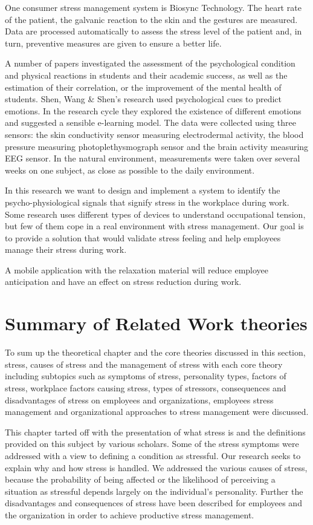 One consumer stress management system is Biosync Technology. The heart rate of the patient, the galvanic reaction to the skin and the gestures are measured. Data are processed automatically to assess the stress level of the patient and, in turn, preventive measures are given to ensure a better life\citep{Nishida2017BioSync:Experience}.

A number of papers investigated the assessment of the psychological condition and physical reactions in students\citep{Santos-Gago2019InnovativeReview} and their academic success, as well as the estimation of their correlation, or the improvement of the mental health of students. Shen, Wang \& Shen's research \citep{article} used psychological cues to predict emotions.  In the research cycle they explored the existence of different emotions and suggested a sensible e-learning model. The data were collected using three sensors: the skin conductivity sensor measuring electrodermal activity, the blood pressure measuring photoplethysmograph sensor and the brain activity measuring EEG sensor. In the natural environment, measurements were taken over several weeks on one subject, as close as possible to the daily environment.

In this research we want to design and implement a system to identify the psycho-physiological signals that signify stress in the workplace during work. Some research uses different types of devices to understand occupational tension, but few of them cope in a real environment with stress management. Our goal is to provide a solution that would validate stress feeling and help employees manage their stress during work.

A mobile application with the relaxation material will reduce employee anticipation and have an effect on stress reduction during work.
\section{Summary of Related Work theories}
To sum up the theoretical chapter and the core theories discussed in this section, stress, causes of stress and the management of stress with each core theory including subtopics such as symptoms of stress, personality types, factors of stress, workplace factors causing stress, types of stressors, consequences and disadvantages of stress on employees and organizations, employees stress management and organizational approaches to stress management were discussed.

This chapter tarted off with the presentation of what stress is and the definitions provided on this subject by various scholars.  Some of the stress symptoms were addressed with a view to defining a condition as stressful. Our research seeks to explain why and how stress is handled. We addressed the various causes of stress, because the probability of being affected or the likelihood of perceiving a situation as stressful depends largely on the individual's personality. Further the disadvantages and consequences of stress have been described for employees and the organization in order to achieve productive stress management.

